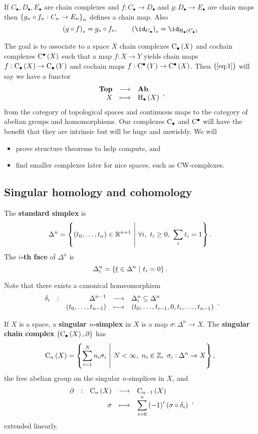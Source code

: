 \begin{exercise*}
If $ C_\bullet, D_\bullet, E_\bullet $ are chain complexes and $ f : C_\bullet \to D_\bullet $ and $ g : D_\bullet \to E_\bullet $ are chain maps then $ \cbr{g_n \circ f_n : C_n \to E_n}_n $ defines a chain map. Also
\begin{equation}
\label{eq:1}
\br{g \circ f}_* = g_* \circ f_*, \qquad \br{\id_{C_\bullet}}_* = \id_{\H_\bullet\br{C_\bullet}}
\end{equation}
\end{exercise*}

\pagebreak

The goal is to associate to a space $ X $ chain complexes $ \C_\bullet\br{X} $ and cochain complexes $ \C^\bullet\br{X} $ such that a map $ f : X \to Y $ yields chain maps $ f : \C_\bullet\br{X} \to \C_\bullet\br{Y} $ and cochain maps $ f : \C^\bullet\br{Y} \to \C^\bullet\br{X} $. Then $ \br{\ref{eq:1}} $ will say we have a functor
$$ \function{\textbf{Top}}{\textbf{Ab}}{X}{\H_\bullet\br{X}}, $$
from the category of topological spaces and continuous maps to the category of abelian groups and homomorphisms. Our complexes $ \mathrm{C}_\bullet $ and $ \mathrm{C}^\bullet $ will have the benefit that they are intrinsic but will be huge and unwieldy. We will
\begin{itemize}
\item prove structure theorems to help compute, and
\item find smaller complexes later for nice spaces, such as CW-complexes.
\end{itemize}

\subsection{Singular homology and cohomology}

\begin{definition*}
The \textbf{standard simplex} is
$$ \Delta^n = \cbr{\br{t_0, \dots, t_n} \in \RR^{n + 1} \st \forall i, \ t_i \ge 0, \ \sum_i t_i = 1}. $$
The \textbf{$ i $-th face} of $ \Delta^n $ is
$$ \Delta_i^n = \cbr{\underline{t} \in \Delta^n \st t_i = 0}. $$
\end{definition*}

Note that there exists a canonical homeomorphism
$$ \function[\delta_i]{\Delta^{n - 1}}{\Delta_i^n \subseteq \Delta^n}{\br{t_0, \dots, t_{n - 1}}}{\br{t_0, \dots, t_{i - 1}, 0, t_i, \dots, t_{n - 1}}}. $$

\begin{definition*}
If $ X $ is a space, a \textbf{singular $ n $-simplex} in $ X $ is a map $ \sigma : \Delta^n \to X $. The \textbf{singular chain complex} $ \br{\C_\bullet\br{X}, \da} $ has
$$ \C_n\br{X} = \cbr{\sum_{i = 1}^N n_i\sigma_i \st N < \infty, \ n_i \in \ZZ, \ \sigma_i : \Delta^n \to X}, $$
the free abelian group on the singular $ n $-simplices in $ X $, and
$$ \function[\da]{\C_n\br{X}}{\C_{n - 1}\br{X}}{\sigma}{\displaystyle\sum_{i = 0}^n \br{-1}^i\br{\sigma \circ \delta_i}}, $$
extended linearly.
\end{definition*}

